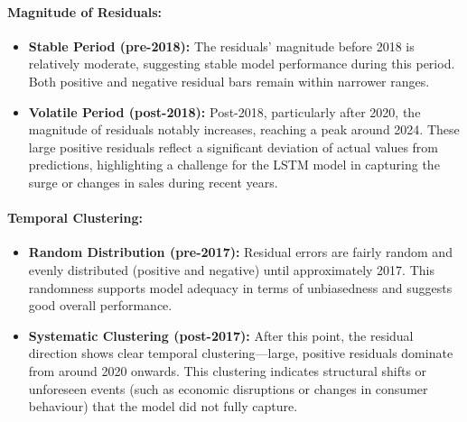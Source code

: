 \documentclass[12pt,a4paper]{report}
\begin{document}
\paragraph{Magnitude of Residuals:}
\begin{itemize}
    \item \textbf{Stable Period (pre-2018):} The residuals' magnitude before 2018 is relatively moderate, suggesting stable model performance during this period. Both positive and negative residual bars remain within narrower ranges.
    
    \item \textbf{Volatile Period (post-2018):} Post-2018, particularly after 2020, the magnitude of residuals notably increases, reaching a peak around 2024. These large positive residuals reflect a significant deviation of actual values from predictions, highlighting a challenge for the LSTM model in capturing the surge or changes in sales during recent years.
\end{itemize}

\paragraph{Temporal Clustering:}
\begin{itemize}
    \item \textbf{Random Distribution (pre-2017):} Residual errors are fairly random and evenly distributed (positive and negative) until approximately 2017. This randomness supports model adequacy in terms of unbiasedness and suggests good overall performance.
    
    \item \textbf{Systematic Clustering (post-2017):} After this point, the residual direction shows clear temporal clustering—large, positive residuals dominate from around 2020 onwards. This clustering indicates structural shifts or unforeseen events (such as economic disruptions or changes in consumer behaviour) that the model did not fully capture.
\end{itemize}
\end{document}
